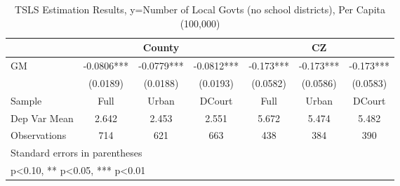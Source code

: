\begin{table}[htbp]\centering
\def\sym#1{\ifmmode^{#1}\else\(^{#1}\)\fi}
\caption{TSLS Estimation Results, y=Number of Local Govts (no school districts), Per Capita (100,000)}
\begin{tabular}{l*{6}{c}}
\toprule
                &\multicolumn{3}{c}{County}            &\multicolumn{3}{c}{CZ}                \\\cmidrule(lr){2-4}\cmidrule(lr){5-7}
\midrule
GM              &  -0.0806***&  -0.0779***&  -0.0812***&   -0.173***&   -0.173***&   -0.173***\\
                & (0.0189)   & (0.0188)   & (0.0193)   & (0.0582)   & (0.0586)   & (0.0583)   \\
\midrule
Sample          &     Full   &    Urban   &   DCourt   &     Full   &    Urban   &   DCourt   \\
Dep Var Mean    &    2.642   &    2.453   &    2.551   &    5.672   &    5.474   &    5.482   \\
Observations    &      714   &      621   &      663   &      438   &      384   &      390   \\
\bottomrule
\multicolumn{7}{l}{\footnotesize Standard errors in parentheses}\\
\multicolumn{7}{l}{\footnotesize * p<0.10, ** p<0.05, *** p<0.01}\\
\end{tabular}
\end{table}
